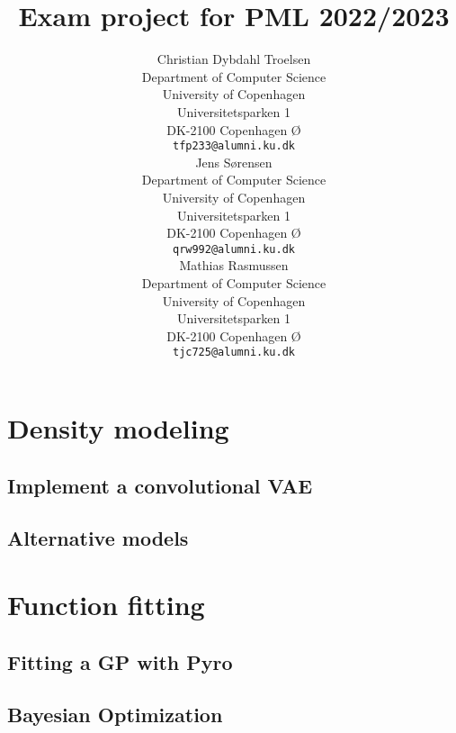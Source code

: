 

\title{Exam project for PML 2022/2023}

\author{ 
	{Christian Dybdahl Troelsen} \\
	Department of Computer Science\\
	University of Copenhagen\\
	Universitetsparken 1 \\
    DK-2100 Copenhagen Ø \\
	\texttt{tfp233@alumni.ku.dk} \\
	\And
	{Jens Sørensen} \\
	Department of Computer Science\\
	University of Copenhagen\\
	Universitetsparken 1 \\
    DK-2100 Copenhagen Ø \\
	\texttt{qrw992@alumni.ku.dk} \\
	\And
	{Mathias Rasmussen} \\
	Department of Computer Science\\
	University of Copenhagen\\
	Universitetsparken 1 \\
    DK-2100 Copenhagen Ø \\
	\texttt{tjc725@alumni.ku.dk} \\
}

\renewcommand{\headeright}{Report}
\renewcommand{\undertitle}{Report}

\renewcommand{\shorttitle}{PML Report}



\maketitle
\section{Density modeling}
\subsection{Implement a convolutional VAE}

\subsection{Alternative models}


\section{Function fitting}
\subsection{Fitting a GP with Pyro}

\subsection{Bayesian Optimization}





